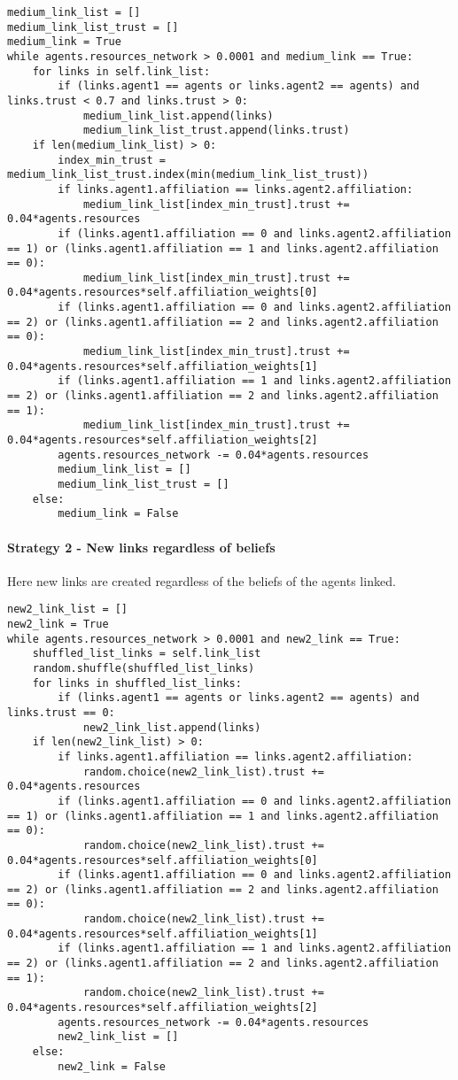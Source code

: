 \begin{lstlisting}
medium_link_list = []
medium_link_list_trust = []
medium_link = True
while agents.resources_network > 0.0001 and medium_link == True:
	for links in self.link_list:
		if (links.agent1 == agents or links.agent2 == agents) and links.trust < 0.7 and links.trust > 0:
			medium_link_list.append(links)
			medium_link_list_trust.append(links.trust)
	if len(medium_link_list) > 0:
		index_min_trust = medium_link_list_trust.index(min(medium_link_list_trust))
		if links.agent1.affiliation == links.agent2.affiliation:
			medium_link_list[index_min_trust].trust += 0.04*agents.resources
		if (links.agent1.affiliation == 0 and links.agent2.affiliation == 1) or (links.agent1.affiliation == 1 and links.agent2.affiliation == 0):
			medium_link_list[index_min_trust].trust += 0.04*agents.resources*self.affiliation_weights[0]
		if (links.agent1.affiliation == 0 and links.agent2.affiliation == 2) or (links.agent1.affiliation == 2 and links.agent2.affiliation == 0):
			medium_link_list[index_min_trust].trust += 0.04*agents.resources*self.affiliation_weights[1]
		if (links.agent1.affiliation == 1 and links.agent2.affiliation == 2) or (links.agent1.affiliation == 2 and links.agent2.affiliation == 1):
			medium_link_list[index_min_trust].trust += 0.04*agents.resources*self.affiliation_weights[2]
		agents.resources_network -= 0.04*agents.resources
		medium_link_list = []
		medium_link_list_trust = []
	else:
		medium_link = False
\end{lstlisting}

\paragraph{Strategy 2 - New links regardless of beliefs}

Here new links are created regardless of the beliefs of the agents linked.

\begin{lstlisting}
new2_link_list = []
new2_link = True
while agents.resources_network > 0.0001 and new2_link == True:
	shuffled_list_links = self.link_list
	random.shuffle(shuffled_list_links)
	for links in shuffled_list_links:
		if (links.agent1 == agents or links.agent2 == agents) and links.trust == 0:
			new2_link_list.append(links)
	if len(new2_link_list) > 0:
		if links.agent1.affiliation == links.agent2.affiliation:
			random.choice(new2_link_list).trust += 0.04*agents.resources
		if (links.agent1.affiliation == 0 and links.agent2.affiliation == 1) or (links.agent1.affiliation == 1 and links.agent2.affiliation == 0):
			random.choice(new2_link_list).trust += 0.04*agents.resources*self.affiliation_weights[0]
		if (links.agent1.affiliation == 0 and links.agent2.affiliation == 2) or (links.agent1.affiliation == 2 and links.agent2.affiliation == 0):
			random.choice(new2_link_list).trust += 0.04*agents.resources*self.affiliation_weights[1]
		if (links.agent1.affiliation == 1 and links.agent2.affiliation == 2) or (links.agent1.affiliation == 2 and links.agent2.affiliation == 1):
			random.choice(new2_link_list).trust += 0.04*agents.resources*self.affiliation_weights[2]
		agents.resources_network -= 0.04*agents.resources
		new2_link_list = []
	else:
		new2_link = False
\end{lstlisting}